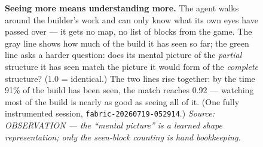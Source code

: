 \documentclass[11pt]{article}
\begin{document}
\begin{figure}[h]
\centering
{}
\caption{\textbf{Seeing more means understanding more.} The agent walks around
the builder's work and can only know what its own eyes have passed over ---
it gets no map, no list of blocks from the game. The gray line shows how much
of the build it has seen so far; the green line asks a harder question: does
its mental picture of the \emph{partial} structure it has seen match the
picture it would form of the \emph{complete} structure? (1.0 = identical.)
The two lines rise together: by the time 91\% of the build has been seen, the
match reaches 0.92 --- watching most of the build is nearly as good as seeing
all of it. (One fully instrumented session,
\texttt{fabric-20260719-052914}.)
\textit{Source: OBSERVATION --- the ``mental picture'' is a learned shape
representation; only the seen-block counting is hand bookkeeping.}}
\end{figure}
\end{document}
